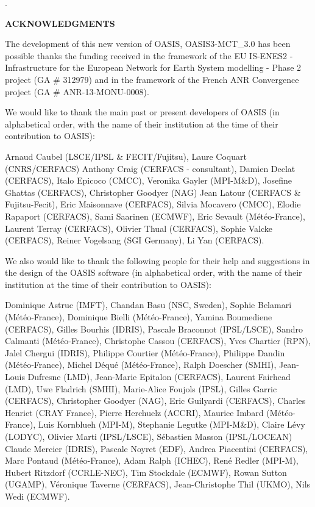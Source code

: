 \newpage
.

\vspace{3cm}

{\bf ACKNOWLEDGMENTS}
 
\vspace{1.5cm}
The development of this new version of OASIS, OASIS3-MCT\_3.0 has been
possible thanks the funding received in the framework
of the EU IS-ENES2 - Infrastructure for the European Network for Earth
System modelling - Phase 2 project (GA \# 312979) and in the framework of the French ANR Convergence project (GA \# ANR-13-MONU-0008).  

\vspace{0.5cm} 

 We would like to thank the main past or present developers of OASIS (in alphabetical order, with the name of their institution at the time of their contribution to OASIS):

Arnaud Caubel (LSCE/IPSL \& FECIT/Fujitsu),
Laure Coquart (CNRS/CERFACS)
Anthony Craig (CERFACS - consultant),
Damien Declat (CERFACS),
Italo Epicoco (CMCC),
Veronika Gayler (MPI-M\&D),
Josefine Ghattas (CERFACS),
Christopher Goodyer (NAG)
Jean Latour (CERFACS \& Fujitsu-Fecit),
Eric Maisonnave (CERFACS),
Silvia Mocavero (CMCC),
Elodie Rapaport (CERFACS),
Sami Saarinen (ECMWF),
Eric Sevault (M\'et\'eo-France),
Laurent Terray (CERFACS),
Olivier Thual (CERFACS),
Sophie Valcke (CERFACS),
Reiner Vogelsang (SGI Germany),
Li Yan (CERFACS).

\vspace{0.5cm}
We also would like to thank the following people for their help
and suggestions in the design of the OASIS software (in alphabetical
order, with the name of their institution at the time of their contribution to OASIS):

Dominique Astruc (IMFT),
Chandan Basu (NSC, Sweden),
Sophie Belamari (M\'et\'eo-France),
Dominique Bielli (M\'et\'eo-France),
Yamina Boumediene (CERFACS), 
Gilles Bourhis (IDRIS),
Pascale Braconnot (IPSL/LSCE),
Sandro Calmanti (M\'et\'eo-France),
Christophe Cassou (CERFACS),
Yves Chartier (RPN),
Jalel Chergui (IDRIS),
Philippe Courtier (M\'et\'eo-France),
Philippe Dandin (M\'et\'eo-France),
Michel D\'equ\'e (M\'et\'eo-France),
Ralph Doescher (SMHI),
Jean-Louis Dufresne (LMD),
Jean-Marie Epitalon (CERFACS),
Laurent Fairhead (LMD),
Uwe Fladrich (SMHI),
Marie-Alice Foujols (IPSL),
Gilles Garric (CERFACS),
Christopher Goodyer (NAG),
Eric Guilyardi (CERFACS),
Charles Henriet (CRAY France),
Pierre Herchuelz (ACCRI),
Maurice Imbard (M\'et\'eo-France),
Luis Kornblueh (MPI-M),
Stephanie Legutke (MPI-M\&D),
Claire L\'evy (LODYC),
Olivier Marti (IPSL/LSCE),
S\'ebastien Masson (IPSL/LOCEAN)
Claude Mercier (IDRIS),
Pascale Noyret (EDF),
Andrea Piacentini (CERFACS),
Marc Pontaud (M\'et\'eo-France),
Adam Ralph (ICHEC),
Ren\'e Redler (MPI-M),
Hubert Ritzdorf (CCRLE-NEC),
Tim Stockdale (ECMWF),
Rowan Sutton (UGAMP),
V\'eronique Taverne (CERFACS),
Jean-Christophe Thil (UKMO),
Nils Wedi (ECMWF).



